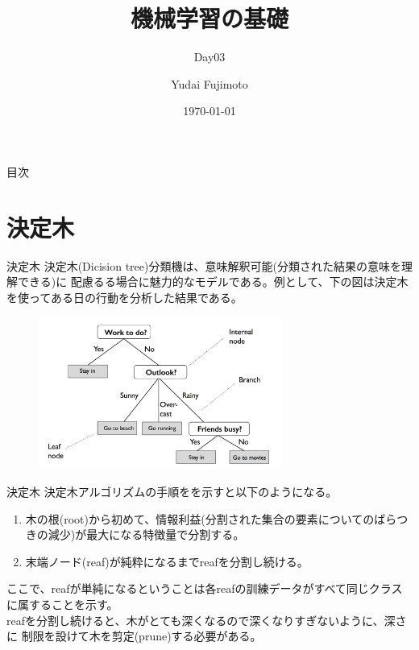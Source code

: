 \documentclass[aspectratio=169, dvipdfmx, 11pt]{beamer} %
\title[Day03]{機械学習の基礎}
\subtitle{Day03}
\author[Yudai Fujimoto]{Yudai Fujimoto}
\institute[SUS]{Suwa University of Science}
\date{\today}
\begin{document}
\maketitle

\begin{frame}{目次}
    \tableofcontents
\end{frame}

\section{決定木}
\begin{frame}{決定木}
    決定木(Dicision tree)分類機は、意味解釈可能(分類された結果の意味を理解できる)に
    配慮るる場合に魅力的なモデルである。例として、下の図は決定木を使ってある日の行動を分析した結果である。
    \begin{figure}[h]
        \begin{center}
        \includegraphics[width=80mm]{img/day03/fig01.png}
        \end{center}
    \end{figure}
\end{frame}

\begin{frame}{決定木}
    決定木アルゴリズムの手順をを示すと以下のようになる。
    \vspace{1em}
    \begin{enumerate}
        \item 木の根(root)から初めて、情報利益(分割された集合の要素についてのばらつきの減少)が最大になる特徴量で分割する。
        \item 末端ノード(reaf)が純粋になるまでreafを分割し続ける。
    \end{enumerate}
    \vspace{1em}
    ここで、reafが単純になるということは各reafの訓練データがすべて同じクラスに属することを示す。 \\
    reafを分割し続けると、木がとても深くなるので深くなりすぎないように、深さに
    制限を設けて木を剪定(prune)する必要がある。
\end{frame}
\end{document}
